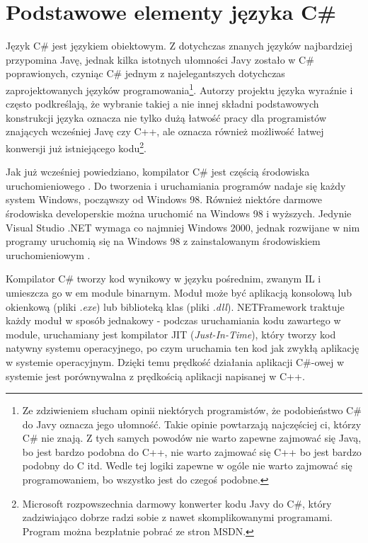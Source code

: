 ﻿\section{Podstawowe elementy języka C\#}

Język C\# jest językiem obiektowym. Z dotychczas znanych języków najbardziej przypomina Javę, jednak
kilka istotnych ułomności Javy zostało w C\# poprawionych, czyniąc C\# jednym z najelegantszych 
dotychczas zaprojektowanych języków programowania\footnote{Ze zdziwieniem słucham opinii niektórych 
programistów, że podobieństwo C\# do Javy oznacza jego ułomność. Takie opinie powtarzają
najczęściej ci, którzy C\# nie znają. Z tych samych powodów nie warto zapewne zajmować się Javą, bo jest
bardzo podobna do C++, nie warto zajmować się C++ bo jest bardzo podobny do C itd. Wedle
tej logiki zapewne w ogóle nie warto zajmować się programowaniem, bo wszystko jest do czegoś podobne.}.
Autorzy projektu języka wyraźnie i często podkreślają, że wybranie takiej a nie innej składni 
podstawowych konstrukcji języka oznacza nie tylko dużą łatwość pracy dla programistów znających 
wcześniej Javę czy C++, ale oznacza również możliwość łatwej konwersji już istniejącego 
kodu\footnote{Microsoft rozpowszechnia darmowy konwerter kodu Javy do C\#, który zadziwiająco dobrze
radzi sobie z nawet skomplikowanymi programami. Program można bezpłatnie pobrać ze stron MSDN.}.

Jak już wcześniej powiedziano, kompilator C\# jest częścią środowiska uruchomieniowego \NETFramework{}. 
Do tworzenia i uruchamiania programów nadaje się każdy system Windows, począwszy od Windows 98. Również
niektóre darmowe środowiska developerskie można uruchomić na Windows 98 i wyższych. Jedynie Visual Studio .NET
wymaga co najmniej Windows 2000, jednak rozwijane w nim programy uruchomią się na Windows 98 z zainstalowanym
środowiskiem uruchomieniowym \NET{}.

Kompilator C\# tworzy kod wynikowy w języku pośrednim, zwanym IL i umieszcza go
w {em module binarnym}. Moduł może być aplikacją konsolową lub okienkową (pliki {\em *.exe}) lub
biblioteką klas (pliki {\em *.dll}). NETFramework{} traktuje każdy moduł w sposób jednakowy - podczas
uruchamiania kodu zawartego w module, uruchamiany jest kompilator JIT ({\em Just-In-Time}), który 
tworzy kod natywny systemu operacyjnego, po czym uruchamia ten kod jak zwykłą aplikację w systemie
operacyjnym. Dzięki temu prędkość działania aplikacji C\#-owej w systemie jest porównywalna
z prędkością aplikacji napisanej w C++. 

